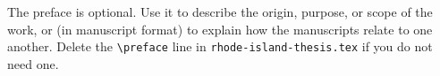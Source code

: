 The preface is optional.  Use it to describe the origin, purpose, or scope
of the work, or (in manuscript format) to explain how the manuscripts
relate to one another.  Delete the \verb|\preface| line in \texttt{rhode-island-thesis.tex} if you do
not need one.
